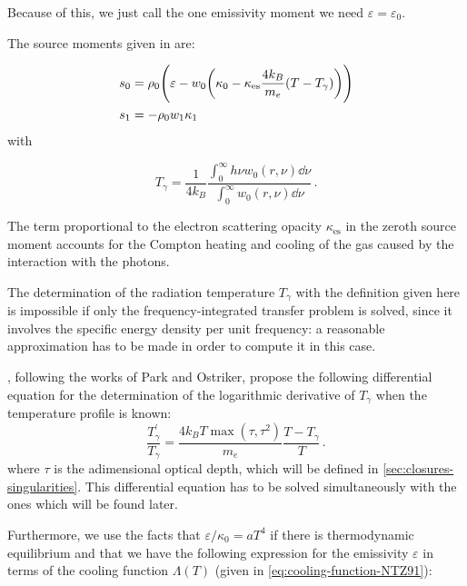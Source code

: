 \documentclass[main.tex]{subfiles}
\begin{document}
Because of this, we just call the one emissivity moment we need \(\varepsilon = \varepsilon_0\).

The source moments given in \cite[eq. 6]{NobiliTurollaZampieri:1991dec} are:

\begin{subequations}
\begin{align}
  s_0 &= \rho_0 \qty(\varepsilon - w_0 \qty(\kappa_0 - \kappa_{\text{es}} \frac{4 k_B}{m_e} (T - T_\gamma)))  \\
  s_1 &= - \rho_0 w_1 \kappa_1
\end{align}
\end{subequations}
with

\begin{equation}
    T_\gamma = \frac{1}{4 k_B} \frac{\displaystyle \int_0^\infty h \nu w_0 (r, \nu) \dd{\nu}}{\displaystyle \int_0^\infty w_0 (r, \nu) \dd{\nu}}\,.
\end{equation}

The term proportional to the electron scattering opacity \(\kappa_{\text{es}}\) in the zeroth source moment accounts for the Compton heating and cooling of the gas caused by the interaction with the photons.

The determination of the radiation temperature \(T_\gamma\) with the definition given here is impossible if only the frequency-integrated transfer problem is solved, since it involves the specific energy density per unit frequency: a reasonable approximation has to be made in order to compute it in this case.

\textcite[eq. 17]{NobiliTurollaZampieri:1991dec}, following the works of Park and Ostriker, propose the following differential equation for the determination of the logarithmic derivative of \(T_\gamma\) when the temperature profile is known:
%
\begin{equation} \label{eq:T-gamma-differential-equation}
  \frac{T_\gamma ^{\prime}}{T_\gamma} = \frac{4 k_B T \max (\tau, \tau^2)}{m_e} \frac{T - T_\gamma}{T}\,.
\end{equation}
%
where \(\tau\) is the adimensional optical depth, which will be defined in \ref{sec:closures-singularities}. This differential equation has to be solved simultaneously with the ones which will be found later.

Furthermore, we use the facts that \(\varepsilon / \kappa_0 = a T^4\) if there is thermodynamic equilibrium and that we have the following expression for the emissivity \(\varepsilon\) in terms of the cooling function \(\Lambda (T)\) (given in \eqref{eq:cooling-function-NTZ91}):
\end{document}
